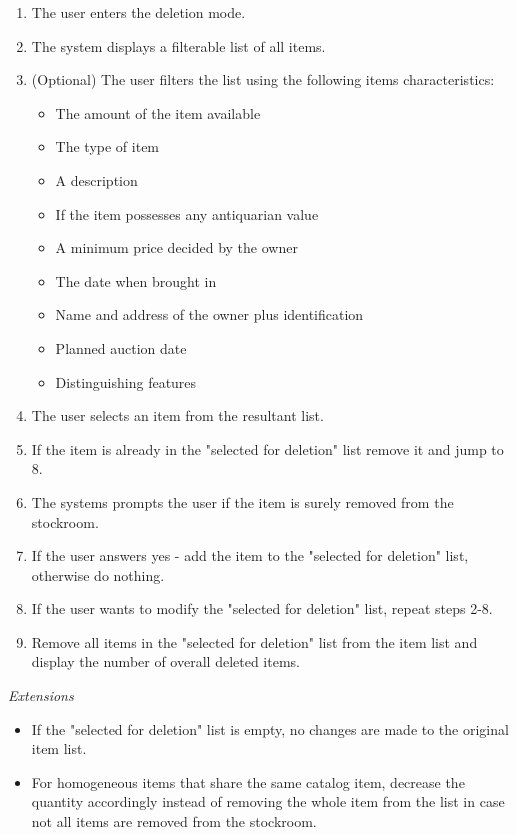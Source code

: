 \begin{enumerate}[noitemsep]
	\item The user enters the deletion mode.
	\item The system displays a filterable list of all items.
	\item (Optional) The user filters the list using the following items characteristics:
	\begin{itemize}[noitemsep]
		\item The amount of the item available
		\item The type of item
		\item A description
		\item If the item possesses any antiquarian value
		\item A minimum price decided by the owner
		\item The date when brought in
		\item Name and address of the owner plus identification
		\item Planned auction date
		\item Distinguishing features
	\end{itemize}
	\item The user selects an item from the resultant list.
	\item If the item is already in the  "selected for deletion" list remove it and jump to 8.
	\item The systems prompts the user if the item is surely removed from the stockroom.
	\item If the user answers yes - add the item to the "selected for deletion" list, otherwise do nothing.
	\item If the user wants to modify the "selected for deletion" list, repeat steps 2-8.
	\item Remove all items in the "selected for deletion" list from the item list and display the number of overall deleted items.
\end{enumerate}
\textsl{Extensions}
\begin{itemize}[noitemsep]
	\item If the "selected for deletion" list is empty, no changes are made to the original item list.
	\item For homogeneous items that share the same catalog item, decrease the quantity accordingly instead of removing the whole item from the list in case not all items are removed from the stockroom.  \\
\end{itemize}
